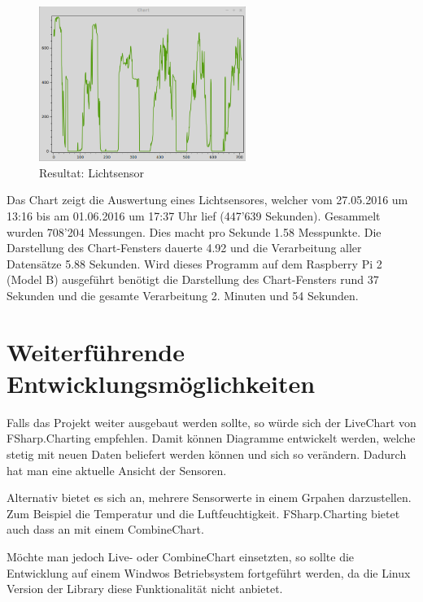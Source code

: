 \begin{figure}[H]
  \centering
  \includegraphics[width=0.6\textwidth]{./images/resultat.png}
  \caption{Resultat: Lichtsensor}
\end{figure}

Das Chart zeigt die Auswertung eines Lichtsensores, welcher vom 27.05.2016 um 13:16 bis am 01.06.2016 um 17:37 Uhr lief (447'639 Sekunden). Gesammelt wurden 708'204 Messungen. Dies macht pro Sekunde 1.58 Messpunkte. Die Darstellung des Chart-Fensters dauerte 4.92 und die Verarbeitung aller Datensätze 5.88 Sekunden. Wird dieses Programm auf dem Raspberry Pi 2 (Model B) ausgeführt benötigt die Darstellung des Chart-Fensters rund 37 Sekunden und die gesamte Verarbeitung 2. Minuten und 54 Sekunden.

\section{Weiterführende Entwicklungsmöglichkeiten}
Falls das Projekt weiter ausgebaut werden sollte, so würde sich der LiveChart von FSharp.Charting empfehlen. Damit können Diagramme entwickelt werden, welche stetig mit neuen Daten beliefert werden können und sich so verändern. Dadurch hat man eine aktuelle Ansicht der Sensoren.

Alternativ bietet es sich an, mehrere Sensorwerte in einem Grpahen darzustellen. Zum Beispiel die Temperatur und die Luftfeuchtigkeit. FSharp.Charting bietet auch dass an mit einem CombineChart.

Möchte man jedoch Live- oder CombineChart einsetzten, so sollte die Entwicklung auf einem Windwos Betriebsystem fortgeführt werden, da die Linux Version der Library diese Funktionalität nicht anbietet.